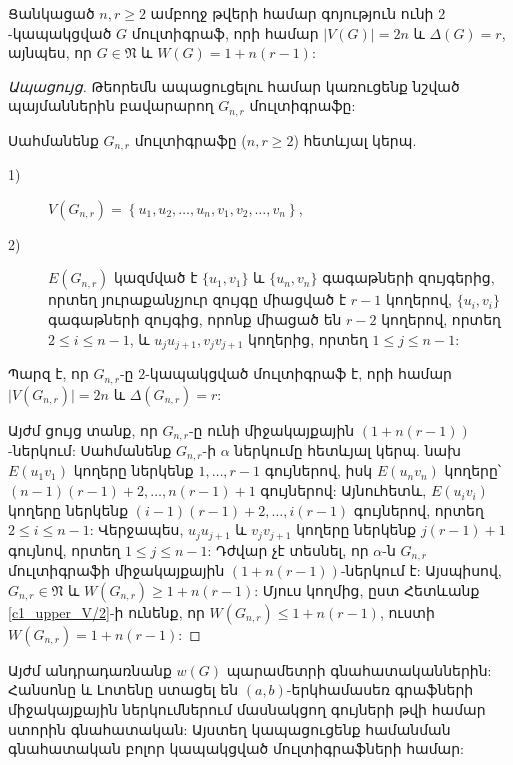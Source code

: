 \begin{theorem}
\label{t1_upper_bounds_are_sharp} Ցանկացած $n,r\geq 2$ ամբողջ թվերի համար գոյություն ունի $2$-կապակցված $G$ մուլտիգրաֆ, որի համար $\vert V(G)\vert =2n$ և
$\Delta(G)=r$, այնպես, որ $G\in \mathfrak{N}$ և $W(G)=1+n(r-1)$:
\end{theorem}
\begin{proof}[Ապացույց] Թեորեմն ապացուցելու համար կառուցենք նշված պայմաններին բավարարող 
$G_{n,r}$ մուլտիգրաֆը:

Սահմանենք $G_{n,r}$ մուլտիգրաֆը ($n,r\geq 2$) հետևյալ կերպ.

\begin{description}
\item[1)] $V\left(G_{n,r}\right)=\left\{u_{1},u_{2},\ldots,u_{n},v_{1},v_{2},\ldots,v_{n}\right\}$,
\item[2)] $E\left(G_{n,r}\right)$ կազմված է $\{u_{1},v_{1}\}$ և $\{u_{n},v_{n}\}$ գագաթների զույգերից, որտեղ յուրաքանչյուր զույգը միացված է $r-1$ կողերով, 
$\{u_{i},v_{i}\}$ գագաթների զույգից, որոնք միացած են $r-2$ կողերով, որտեղ $2\leq i\leq n-1$, և $u_{j}u_{j+1},v_{j}v_{j+1}$ կողերից, որտեղ $1\leq j\leq n-1$:
\end{description}

Պարզ է, որ $G_{n,r}$-ը $2$-կապակցված մուլտիգրաֆ է, որի համար $\vert
V\left(G_{n,r}\right)\vert =2n$ և $\Delta\left(G_{n,r}\right)=r$:

Այժմ ցույց տանք, որ $G_{n,r}$-ը ունի միջակայքային $(1+n(r-1))$-ներկում:
Սահմանենք $G_{n,r}$-ի $\alpha$ ներկումը հետևյալ կերպ. նախ $E(u_{1}v_{1})$ կողերը ներկենք $1,\ldots,r-1$ գույներով, իսկ $E(u_{n}v_{n})$ կողերը՝
$(n-1)(r-1)+2,\ldots,n(r-1)+1$ գույներով: Այնուհետև,
$E(u_{i}v_{i})$ կողերը ներկենք $(i-1)(r-1)+2,\ldots,i(r-1)$ գույներով, որտեղ
$2\leq i\leq n-1$: Վերջապես, $u_{j}u_{j+1}$ և
$v_{j}v_{j+1}$ կողերը ներկենք $j(r-1)+1$ գույնով, որտեղ $1\leq j\leq n-1$: Դժվար չէ տեսնել, որ $\alpha$-ն $G_{n,r}$ մուլտիգրաֆի միջակայքային $(1+n(r-1))$-ներկում է: Այսպիսով, $G_{n,r}\in \mathfrak{N}$ և $W\left(G_{n,r}\right)\geq 1+n(r-1)$:
Մյուս կողմից, ըստ Հետևանք \ref{c1_upper_V/2}-ի ունենք, որ $W\left(G_{n,r}\right)\leq 1+n(r-1)$, ուստի $W\left(G_{n,r}\right)= 1+n(r-1)$:
\end{proof}


Այժմ անդրադառնանք $w(G)$ պարամետրի գնահատականներին: Հանսոնը և Լոտենը \cite{HansonLoten} ստացել են $(a,b)$-երկհամասեռ գրաֆների միջակայքային ներկումներում մասնակցող գույների թվի համար ստորին գնահատական: Այստեղ կապացուցենք համանման գնահատական բոլոր կապակցված մուլտիգրաֆների համար:

